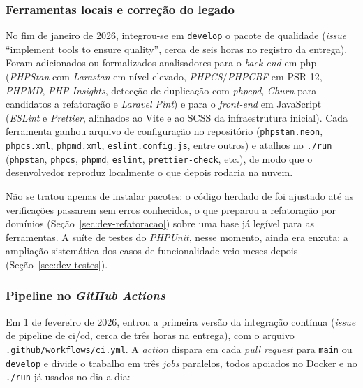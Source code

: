 \subsubsection{Ferramentas locais e correção do legado}

No fim de janeiro de 2026, integrou-se em \texttt{develop} o pacote de qualidade (\textit{issue} ``implement tools to ensure quality'', cerca de seis horas no registro da entrega). Foram adicionados ou formalizados analisadores para o \textit{back-end} em \acrshort{php} (\textit{PHPStan} com \textit{Larastan} em nível elevado, \textit{PHPCS}/\textit{PHPCBF} em PSR-12, \textit{PHPMD}, \textit{PHP Insights}, detecção de duplicação com \textit{phpcpd}, \textit{Churn} para candidatos a refatoração e \textit{Laravel Pint}) e para o \textit{front-end} em JavaScript (\textit{ESLint} e \textit{Prettier}, alinhados ao Vite e ao SCSS da infraestrutura inicial). Cada ferramenta ganhou arquivo de configuração no repositório (\texttt{phpstan.neon}, \texttt{phpcs.xml}, \texttt{phpmd.xml}, \texttt{eslint.config.js}, entre outros) e atalhos no \texttt{./run} (\texttt{phpstan}, \texttt{phpcs}, \texttt{phpmd}, \texttt{eslint}, \texttt{prettier-check}, etc.), de modo que o desenvolvedor reproduz localmente o que depois rodaria na nuvem.

Não se tratou apenas de instalar pacotes: o código herdado de  foi ajustado até as verificações passarem sem erros conhecidos, o que preparou a refatoração por domínios (Seção~\ref{sec:dev-refatoracao}) sobre uma base já legível para as ferramentas. A suíte de testes do \textit{PHPUnit}, nesse momento, ainda era enxuta; a ampliação sistemática dos casos de funcionalidade veio meses depois (Seção~\ref{sec:dev-testes}).

\subsubsection{Pipeline no \textit{GitHub Actions}}

Em 1 de fevereiro de 2026, entrou a primeira versão da integração contínua (\textit{issue} de pipeline de \acrfull{ci/cd}, cerca de três horas na entrega), com o arquivo \texttt{.github/workflows/ci.yml}. A \textit{action} dispara em cada \textit{pull request} para \texttt{main} ou \texttt{develop} e divide o trabalho em três \textit{jobs} paralelos, todos apoiados no Docker e no \texttt{./run} já usados no dia a dia:

